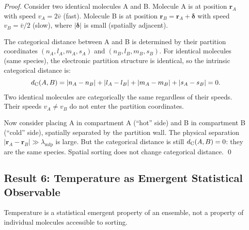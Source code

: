 \begin{proof}
Consider two identical molecules A and B. Molecule A is at position $\mathbf{r}_A$
with speed $v_A = 2\bar{v}$ (fast). Molecule B is at position $\mathbf{r}_B = \mathbf{r}_A + \boldsymbol{\delta}$
with speed $v_B = \bar{v}/2$ (slow), where $|\boldsymbol{\delta}|$ is small (spatially adjacent).

The categorical distance between A and B is determined by their partition
coordinates $(n_A, l_A, m_A, s_A)$ and $(n_B, l_B, m_B, s_B)$. For identical
molecules (same species), the electronic partition structure is identical, so
the intrinsic categorical distance is:
\begin{equation}
  d_{\mathrm{C}}(A, B) = |n_A - n_B| + |l_A - l_B| + |m_A - m_B| + |s_A - s_B| = 0.
\end{equation}
Two identical molecules are categorically the same regardless of their speeds.
Their speeds $v_A \neq v_B$ do not enter the partition coordinates.

Now consider placing A in compartment A (``hot'' side) and B in compartment B
(``cold'' side), spatially separated by the partition wall. The physical
separation $|\mathbf{r}_A - \mathbf{r}_B| \gg \lambda_{\mathrm{mfp}}$ is large.
But the categorical distance is still $d_{\mathrm{C}}(A, B) = 0$: they are the same species.
Spatial sorting does not change categorical distance. \qed
\end{proof}

\subsection{Result 6: Temperature as Emergent Statistical Observable}

\begin{theorem}
\label{thm:temperature_emergence}
Temperature is a statistical emergent property of an ensemble, not a property
of individual molecules accessible to sorting.
\end{theorem}

